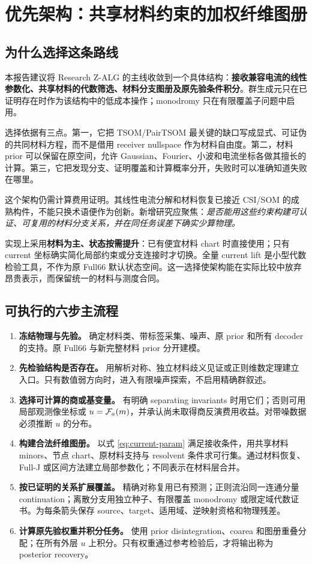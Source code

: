 \section{优先架构：共享材料约束的加权纤维图册}

\subsection{为什么选择这条路线}

本报告建议将 Research Z-ALG 的主线收敛到一个具体结构：\textbf{接收兼容电流的线性参数化、共享材料的代数筛选、材料分支图册及原先验条件积分}。群生成元只在已证明存在时作为该结构中的低成本操作；monodromy 只在有限覆盖子问题中启用。

选择依据有三点。第一，它把 TSOM/PairTSOM 最关键的缺口写成显式、可证伪的共同材料方程，而不是借用 receiver nullspace 作为材料自由度。第二，材料 prior 可以保留在原空间，允许 Gaussian、Fourier、小波和电流坐标各做其擅长的计算。第三，它把发现分支、证明覆盖和计算概率分开，失败时可以准确知道失败在哪里。

这个架构仍需计算费用证明。其线性电流分解和材料恢复已接近 CSI/SOM 的成熟构件，不能只换术语便作为创新。新增研究应聚焦：\emph{是否能用这些约束构建可认证、可复用的材料分支关系，并在同任务误差下确实少算物理。}

实现上采用\textbf{材料为主、状态按需提升}：已有便宜材料 chart 时直接使用；只有 current 坐标确实简化局部约束或分支连接时才切换。全量 current lift 是小型代数检验工具，不作为原 Full66 默认状态空间。这一选择使架构能在实际比较中放弃昂贵表示，而保留统一的材料与测度合同。

\subsection{可执行的六步主流程}

\begin{enumerate}
\item \textbf{冻结物理与先验。} 确定材料类、带标签采集、噪声、原 prior 和所有 decoder 的支持。原 Full66 与新完整材料 prior 分开建模。
\item \textbf{先检验结构是否存在。} 用解析对称、独立材料歧义见证或正则维数定理建立入口。只有数值弱方向时，进入有限噪声探索，不启用精确群叙述。
\item \textbf{选择可计算的商或基变量。} 有明确 separating invariants 时用它们；否则可用局部观测像坐标或 $u={\mathcal F_a}(m)$，并承认尚未取得商反演费用收益。对带噪数据必须推断 $u$ 的分布。
\item \textbf{构建合法纤维图册。} 以式 \eqref{eq:current-param} 满足接收条件，用共享材料 minors、节点 chart、原材料支持与 resolvent 条件求可行集。通过材料恢复、Full-J 或区间方法建立局部参数化；不同表示在材料层合并。
\item \textbf{按已证明的关系扩展覆盖。} 精确对称复用已有预测；正则流沿同一连通分量 continuation；离散分支用独立种子、有限覆盖 monodromy 或限定域代数证书。为每条箭头保存 source、target、适用域、逆映射资格和物理残差。
\item \textbf{计算原先验权重并积分任务。} 使用 prior disintegration、coarea 和图册重叠分配；在所有外层 $u$ 上积分。只有权重通过参考检验后，才将输出称为 posterior recovery。
\end{enumerate}

